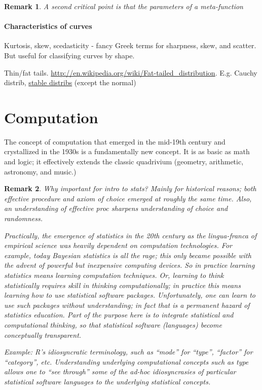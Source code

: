 \documentclass[reqno,12pt]{tufte-book}
\numberwithin{equation}{subsection}
\newtheorem{remark}{Remark}
\begin{document}
\begin{remark}
  A second critical point is that the parameters of a meta-function
\end{remark}

\subsection{Characteristics of curves}

Kurtosis, skew, scedasticity - fancy Greek terms for sharpness, skew,
and scatter.  But useful for classifying curves by shape.

Thin/fat tails.
\url{http://en.wikipedia.org/wiki/Fat-tailed_distribution}.
E.g. Cauchy distrib,
\href{http://en.wikipedia.org/wiki/Stable_distributions}{stable
  distribs} (except the normal)

\part{Computation}

The concept of computation that emerged in the mid-19th century and
crystallized in the 1930s is a fundamentally new concept.  It is as
basic as math and logic; it effectively extends the classic quadrivium
(geometry, arithmetic, astronomy, and music.)

\begin{remark}
  Why important for intro to stats?  Mainly for historical reasons;
  both effective procedure and axiom of choice emerged at roughly the
  same time.  Also, an understanding of effective proc sharpens
  understanding of choice and randomness.

  Practically, the emergence of statistics in the 20th century as the
  lingua-franca of empirical science was heavily dependent on
  computation technologies.  For example, today Bayesian statistics is
  all the rage; this only became possible with the advent of powerful
  but inexpensive computing devices.  So in practice learning
  statistics means learning computation techniques.  Or, learning to
  think statistically requires skill in thinking computationally; in
  practice this means learning how to use statistical software
  packages.  Unfortunately, one can learn to use such packages without
  understanding; in fact that is a permanent hazard of statistics
  education.  Part of the purpose here is to integrate statistical and
  computational thinking, so that statistical software (languages)
  become conceptually transparent.

  Example: R's idiosyncratic terminology, such as ``mode'' for
  ``type'', ``factor'' for ``category'', etc.  Understanding
  underlying computational concepts such as type allows one to ``see
  through'' some of the ad-hoc idiosyncrasies of particular
  statistical software languages to the underlying statistical
  concepts.
\end{remark}
\end{document}
